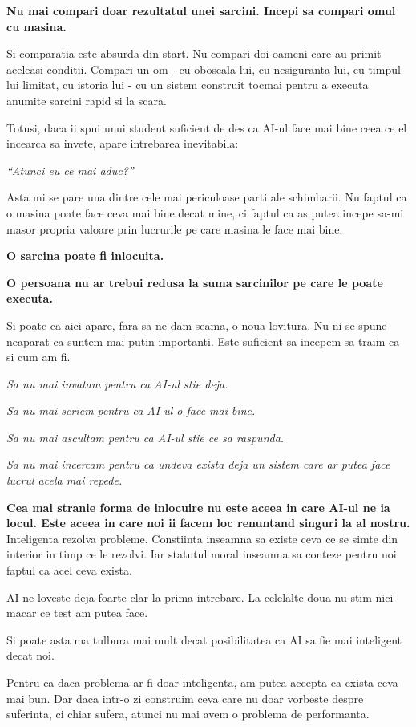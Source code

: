 \textbf{Nu mai compari doar rezultatul unei sarcini. Incepi sa compari
omul cu masina.}

Si comparatia este absurda din start. Nu compari doi oameni care au
primit aceleasi conditii. Compari un om - cu oboseala lui, cu
nesiguranta lui, cu timpul lui limitat, cu istoria lui - cu un sistem
construit tocmai pentru a executa anumite sarcini rapid si la scara.

Totusi, daca ii spui unui student suficient de des ca AI-ul face mai
bine ceea ce el incearca sa invete, apare intrebarea inevitabila:

\textit{``Atunci eu ce mai aduc?''}

Asta mi se pare una dintre cele mai periculoase parti ale schimbarii. Nu
faptul ca o masina poate face ceva mai bine decat mine, ci faptul ca as
putea incepe sa-mi masor propria valoare prin lucrurile pe care masina
le face mai bine.

\textbf{O sarcina poate fi inlocuita.}

\textbf{O persoana nu ar trebui redusa la suma sarcinilor pe care le
poate executa.}

Si poate ca aici apare, fara sa ne dam seama, o noua lovitura. Nu ni se
spune neaparat ca suntem mai putin importanti. Este suficient sa
incepem sa traim ca si cum am fi.

\textit{Sa nu mai invatam pentru ca AI-ul stie deja.}

\textit{Sa nu mai scriem pentru ca AI-ul o face mai bine.}

\textit{Sa nu mai ascultam pentru ca AI-ul stie ce sa raspunda.}

\textit{Sa nu mai incercam pentru ca undeva exista deja un sistem care
ar putea face lucrul acela mai repede.}

\textbf{Cea mai stranie forma de inlocuire nu este aceea in care AI-ul
ne ia locul. Este aceea in care noi ii facem loc renuntand singuri la al
nostru.} Inteligenta rezolva probleme. Constiinta inseamna sa existe ceva
ce se simte din interior in timp ce le rezolvi. Iar statutul moral
inseamna sa conteze pentru noi faptul ca acel ceva exista.

AI ne loveste deja foarte clar la prima intrebare. La celelalte doua nu
stim nici macar ce test am putea face.

Si poate asta ma tulbura mai mult decat posibilitatea ca AI sa fie mai
inteligent decat noi.

Pentru ca daca problema ar fi doar inteligenta, am putea accepta ca
exista ceva mai bun. Dar daca intr-o zi construim ceva care nu doar
vorbeste despre suferinta, ci chiar sufera, atunci nu mai avem o
problema de performanta.

